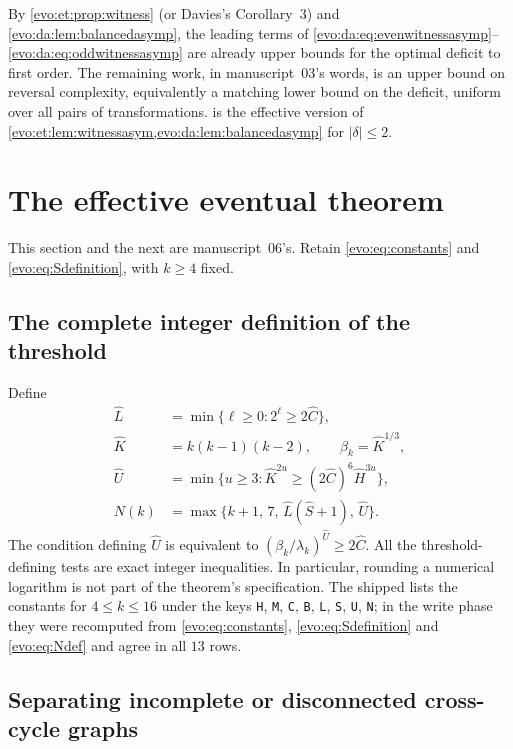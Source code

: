 \documentclass[11pt,a4paper]{article}
\numberwithin{equation}{section}
\theoremstyle{definition}
\theoremstyle{remark}
\begin{document}
By \cref{evo:et:prop:witness} (or Davies's Corollary~3) and
\cref{evo:da:lem:balancedasymp}, the leading terms of
\eqref{evo:da:eq:evenwitnessasymp}--\eqref{evo:da:eq:oddwitnessasymp} are
already upper bounds for the optimal deficit to first order. The remaining
work, in manuscript~03's words, is an upper bound on reversal complexity,
equivalently a matching lower bound on the deficit, uniform over all pairs of
transformations.  is the effective version of
\cref{evo:et:lem:witnessasym,evo:da:lem:balancedasymp} for $|\delta|\le2$.

\section{The effective eventual theorem}\label{evo:sec:eventual}

This section and the next are manuscript~06's. Retain \eqref{evo:eq:constants}
and \eqref{evo:eq:Sdefinition}, with $k\ge4$ fixed.

\subsection{The complete integer definition of the threshold}

Define
\begin{equation}\label{evo:eq:Ndef}
\begin{split}
 \hat L&=\min\{\ell\ge0:2^\ell\ge2\hat C\},\\
 \hat K&=k(k-1)(k-2),\qquad \beta_k=\hat K^{1/3},\\
 \hat U&=\min\{u\ge3:\hat K^{2u}\ge(2\hat C)^6\hat H^{3u}\},\\
 N(k)&=\max\{k+1,\,7,\,\hat L(\hat S+1),\,\hat U\}.
\end{split}
\end{equation}
The condition defining $\hat U$ is equivalent to
$(\beta_k/\lambda_k)^{\hat U}\ge2\hat C$. All the threshold-defining tests are
exact integer inequalities. In particular, rounding a numerical logarithm is
not part of the theorem's specification. The shipped
 lists the constants for
$4\le k\le16$ under the keys \texttt{H}, \texttt{M}, \texttt{C}, \texttt{B},
\texttt{L}, \texttt{S}, \texttt{U}, \texttt{N}; in the write phase they were
recomputed from \eqref{evo:eq:constants}, \eqref{evo:eq:Sdefinition} and
\eqref{evo:eq:Ndef} and agree in all $13$ rows.

\subsection{Separating incomplete or disconnected cross-cycle graphs}
\end{document}
